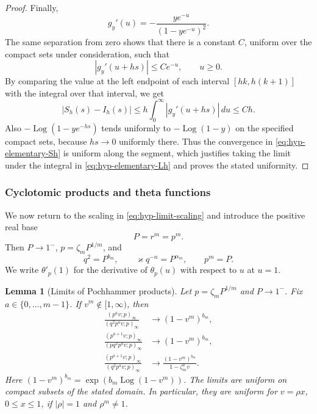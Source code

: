 \documentclass[12pt]{amsart}
\newtheorem{lem}[thm]{Lemma}
\theoremstyle{definition}
\numberwithin{equation}{section}
\theoremstyle{definition}
\let\tht\theta
\let\ge\geqslant
\let\le\leqslant
\def\beq{\begin{equation}}
\def\eeq{\end{equation}}
\begin{document}
\begin{proof}
Finally,
\[
 g_y'(u)=-\frac{ye^{-u}}{(1-ye^{-u})^2}.
\]
The same separation from zero shows that there is a constant
$C$, uniform over the compact sets under consideration, such
that
\[
 |g_y'(u+hs)|\le C e^{-u},\qquad u\ge0.
\]
By comparing the value at the left endpoint of each interval
$[hk,h(k+1)]$ with the integral over that interval, we get
\[
 \left|S_h(s)-I_h(s)\right|
 \le h\int_0^\infty|g_y'(u+hs)|\,du
 \le Ch.
\]
Also $-\operatorname{Log}(1-ye^{-hs})$ tends uniformly to
$-\operatorname{Log}(1-y)$ on the specified compact sets,
because $hs\to0$ uniformly there.  Thus the convergence in
\eqref{eq:hyp-elementary-Sh} is uniform along the segment,
which justifies taking the limit under the integral in
\eqref{eq:hyp-elementary-Lh} and proves the stated uniformity.
\end{proof}

\subsubsection{Cyclotomic products and theta functions}

We now return to the scaling in
\eqref{eq:hyp-limit-scaling} and introduce the positive real base
\[
 P=r^m=p^m.
\]
Then $P\to1^-$, $p=\zeta_m P^{1/m}$, and
\beq\label{eq:hyp-limit-scale-identity}
 q^2=P^{b_m},\qquad
 \varkappa q^{-n}=P^{\alpha_m},\qquad p^m=P.
\eeq
We write $\tht'_p(1)$ for the derivative of $\tht_p(u)$
with respect to $u$ at $u=1$.

\begin{lem}[Limits of Pochhammer products]
\label{lem:hyp-cyclotomic-products}
Let $p=\zeta_mP^{1/m}$ and $P\to1^-$.  Fix
$a\in\{0,\ldots,m-1\}$.  If $v^m\notin[1,\infty)$, then
\beq\label{eq:hyp-limit-products}
 \begin{aligned}
 \frac{(p^a v;p)_\infty}{(q^2p^a v;p)_\infty}
 &\longrightarrow (1-v^m)^{b_m},\\
 \frac{(p^{a+1}v;p)_\infty}
      {(pq^2p^a v;p)_\infty}
 &\longrightarrow (1-v^m)^{b_m},\\
 \frac{(p^{a+1}v;p)_\infty}
      {(q^2p^a v;p)_\infty}
 &\longrightarrow
 \frac{(1-v^m)^{b_m}}{1-\zeta_m^a v}.
 \end{aligned}
\eeq
Here $(1-v^m)^{b_m}=\exp(b_m\operatorname{Log}(1-v^m))$.
The limits are uniform on compact subsets of the stated
domain.  In particular, they are uniform for $v=\rho x$,
$0\le x\le1$, if $|\rho|=1$ and $\rho^m\ne1$.
\end{lem}
\end{document}
